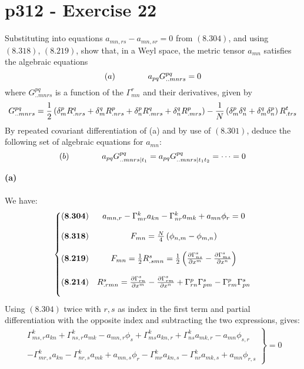 \section{p312 - Exercise 22}
\begin{tcolorbox}
Substituting into equations $a_{mn,rs}-a_{mn,sr}=0$ from $\mathbf{(8.304)}$, and using $\mathbf{(8.318)}$, $\mathbf{(8.219)}$, show that, in a Weyl space, the metric tensor $a_{mn}$ satisfies the algebraic equations
$$(a)\quad\quad\quad\quad a_{pq}G^{pq}_{..mnrs}=0$$
where $G^{pq}_{..mnrs}$ is a function of the $\Gamma^r_{mn}$ and their derivatives, given by
$$G^{pq}_{..mnrs}= \frac{1}{2}\left(\delta^p_mR^q_{.nrs} +\delta^q_mR^p_{.nrs} +\delta^p_nR^q_{.mrs} +\delta^q_nR^p_{.mrs} \right)-\frac{1}{N}\left(\delta^p_m\delta^q_n+\delta^q_m\delta^p_n\right)R^t_{.trs}$$
By repeated covariant differentiation of (a) and by use of $\mathbf{(8.301)}$, deduce the following set of algebraic equations for $a_{mn}$:
$$(b)\quad\quad\quad\quad a_{pq}G^{pq}_{..mnrs|t_1}=a_{pq}G^{pq}_{..mnrs|t_1t_2}=\dots =0$$
\end{tcolorbox}
\textbf{(a)}\\\\
We have:
\begin{align}
\left\{\begin{matrix}
\mathbf{(8.304)}&a_{mn,r}-\Gamma^k_{mr}a_{kn} - \Gamma^k_{nr}a_{mk} + a_{mn}\phi_{r}=0\\\\
\mathbf{(8.318)}&F_{mn} = \frac{N}{4}\left(\phi_{n,m}- \phi_{m,n}\right)\\\\
\mathbf{(8.219)}&F_{mn} = \frac{1}{2} R^s_{.smn}=\frac{1}{2} \left(\pdv{\Gamma^s_{ns}}{x^m} - \pdv{\Gamma^s_{ms}}{x^n}\right)\\\\
\mathbf{(8.214)}&R^s_{.rmn} = \pdv{\Gamma^s_{rn}}{x^m} - \pdv{\Gamma^s_{rm}}{x^n}+\Gamma^p_{rn}\Gamma^s_{pm}-\Gamma^p_{rm}\Gamma^s_{pn}\\\\
\end{matrix}\right.
\end{align}
 Using $\mathbf{(8.304)}$ twice with $r,s$ as index in the first term and partial differentiation with the opposite index and subtracting the two expressions, gives:
\begin{align}\left.\begin{matrix}
\Gamma^k_{ms,r}a_{kn} + \Gamma^k_{ns,r}a_{mk} - a_{mn,r}\phi_{s}+\Gamma^k_{ms}a_{kn,r} + \Gamma^k_{ns}a_{mk,r} - a_{mn}\phi_{s,r}\\\\
-\Gamma^k_{mr,s}a_{kn} - \Gamma^k_{nr,s}a_{mk} + a_{mn,s}\phi_{r}-\Gamma^k_{mr}a_{kn,s} - \Gamma^k_{nr}a_{mk,s} + a_{mn}\phi_{r,s}
\end{matrix}\right\}=0
\end{align} 
